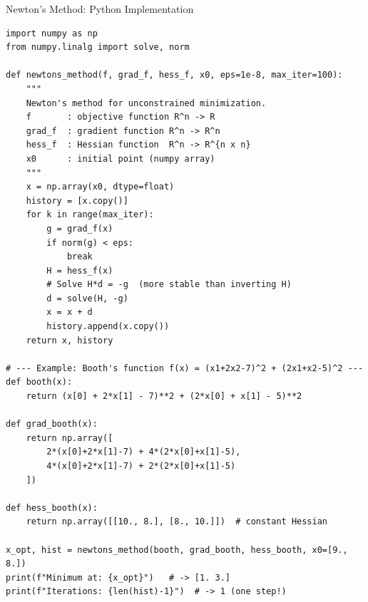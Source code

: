 \documentclass[aspectratio=169,10pt]{beamer}
\begin{document}

\begin{frame}[fragile]{Newton's Method: Python Implementation}
\begin{lstlisting}[caption={Newton's method (multivariate) in Python}]
import numpy as np
from numpy.linalg import solve, norm

def newtons_method(f, grad_f, hess_f, x0, eps=1e-8, max_iter=100):
    """
    Newton's method for unconstrained minimization.
    f       : objective function R^n -> R
    grad_f  : gradient function R^n -> R^n
    hess_f  : Hessian function  R^n -> R^{n x n}
    x0      : initial point (numpy array)
    """
    x = np.array(x0, dtype=float)
    history = [x.copy()]
    for k in range(max_iter):
        g = grad_f(x)
        if norm(g) < eps:
            break
        H = hess_f(x)
        # Solve H*d = -g  (more stable than inverting H)
        d = solve(H, -g)
        x = x + d
        history.append(x.copy())
    return x, history

# --- Example: Booth's function f(x) = (x1+2x2-7)^2 + (2x1+x2-5)^2 ---
def booth(x):
    return (x[0] + 2*x[1] - 7)**2 + (2*x[0] + x[1] - 5)**2

def grad_booth(x):
    return np.array([
        2*(x[0]+2*x[1]-7) + 4*(2*x[0]+x[1]-5),
        4*(x[0]+2*x[1]-7) + 2*(2*x[0]+x[1]-5)
    ])

def hess_booth(x):
    return np.array([[10., 8.], [8., 10.]])  # constant Hessian

x_opt, hist = newtons_method(booth, grad_booth, hess_booth, x0=[9., 8.])
print(f"Minimum at: {x_opt}")   # -> [1. 3.]
print(f"Iterations: {len(hist)-1}")  # -> 1 (one step!)
\end{lstlisting}
\end{frame}

\end{document}
